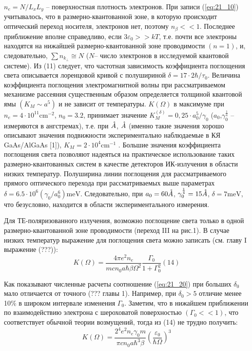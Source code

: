 { $n_{e} =N/L_{x} L_{y} $ – поверхностная плотность электронов. При записи (\ref{eq:21_10}) учитывалось, что в размерно-квантованной зоне, в которую происходит оптический переход носителя, электронов нет, поэтому  $n_{\beta } <<1$. Последнее приближение вполне справедливо, если  $3\varepsilon _{0} >>kT$, т.е. почти все электроны находятся на нижайшей размерно-квантованной зоне проводимости $(n=1)$, и, следовательно,   $\sum n_{k_{\bot } } \cong N$ ($N$– число электронов в исследуемой квантовой системе). Из (11) следует, что частотная зависимость коэффициента поглощения света описывается лоренцовой кривой с полушириной  $\delta =17\cdot 2\hbar /\tau _{0} $. Величина коэффициента поглощения электромагнитной волны при рассматриваемом механизме рассеяния существенным образом определяется толщиной квантовой ямы $\left(K_{M} \sim a^{5} \right)$ и не зависит от температуры. $K\left(\Omega \right)$  в максимуме при $n_{e} =4\cdot 10^{11} \text{cm}^{-2} $, $n_{0} =3.2$,   принимает значение   $K_{M}^{\left(\delta \right)} =0,25\cdot a_{0}^{5} /\gamma _{0} $ ($a_{0} $,$\gamma _{0}^{\frac{1}{4}} $ – измеряются в ангстремах), т.е. при  $\AA$,  $\AA$ (именно такие значения   хорошо описывают значения подвижности   экспериментально наблюдаемые в КЯ GaAs/AlGaAs \cite{West1985}[1]), $K_{M} =2\cdot 10^{4} \text{cm}^{-1} $ . Большие значения коэффициента поглощения света позволяют надеяться на практическое использование таких размерно-квантованных систем в качестве детекторов ИК-излучения в области низких температур. Полуширина линии поглощения для рассматриваемого прямого оптического перехода при рассматриваемых выше параметрах $\delta =6.5\cdot 10^{6} \left(\gamma _{0} /a_{0}^{6} \right)\text{meV}$. Следовательно, при  $a_{0} = 60 \AA$,  $\gamma _{0}^{\frac{1}{4}} = 15 \AA$,  $\delta = 7 \text{meV}$, что безусловно, находится в области экспериментального измерения.

Для ТЕ-поляризованного излучения, возможно поглощение света только в одной размерно-квантованной зоне проводимости (переход III на рис.1). В случае низких температур выражение для поглощения света можно записать (см. главу I выражение (???)):
\begin{equation} \label{eq:21_20}
K(\Omega )=\frac{4\pi e^{2} n_{e} }{mcn_{0} a\hbar \beta \Omega ^{2} } \frac{\Gamma _{0} }{1+\Gamma _{0}^{2} }   (14)
\end{equation} 

Как показывают численные расчеты соотношение (\ref{eq:21_20}) при больших $\delta $${}_{0}$ мало отличается от точного (??? главы 1). Например, при $\delta_{0} > 5$ отличие менее 10\% в широком интервале изменения $\Gamma_{0}$. Заметим, что в нижайшем приближении по взаимодействию электрона с шероховатой поверхностью $(\Gamma_{0}<<1)$, что соответствует обычной теории возмущений, тогда из (14) не трудно получить:
\begin{equation} \label{eq:21_30}
K(\Omega )=\frac{2^{4} e^{2} n_{e} \gamma _{0} m}{\pi cn_{0} a\hbar ^{3} \beta } \left(\frac{\varepsilon _{0} }{\hbar \Omega } \right)^{3}
\end{equation} 

}
